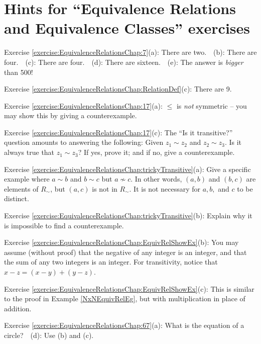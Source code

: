 \section{Hints for ``Equivalence Relations and Equivalence Classes'' exercises}\label{secEqRelChapHints} 

\noindent Exercise \ref{exercise:EquivalenceRelationsChap:7}(a): There are two.~~(b): There are four.~~(c): There are four.~~(d): There are sixteen.~~(e): The answer is \emph{bigger} than 500!

\noindent Exercise \ref{exercise:EquivalenceRelationsChap:RelationDef}(c): There are 9.

\noindent Exercise \ref{exercise:EquivalenceRelationsChap:17}(a): $\leq$ is \emph{not} symmetric -- you may show this by giving a counterexample.

\noindent Exercise \ref{exercise:EquivalenceRelationsChap:17}(c): The ``Is it transitive?'' question amounts to answering the following:  Given $z_1 \sim z_2$ and $z_2 \sim z_3$.  Is it always true that $z_1 \sim z_3$?  If yes, prove it; and if no, give a counterexample. 

\noindent Exercise \ref{exercise:EquivalenceRelationsChap:trickyTransitive}(a): Give a specific example where $a \sim b$ and $b \sim c$ but $a \not\sim c$.  In other words, $(a,b)$ and $(b,c)$ are elements of $R_{\sim}$, but $(a,c)$ is not in  $R_{\sim}$. It is not necessary for $a,b,$ and $c$ to be distinct.

\noindent Exercise \ref{exercise:EquivalenceRelationsChap:trickyTransitive}(b): Explain why it is impossible to find a counterexample.

\noindent Exercise \ref{exercise:EquivalenceRelationsChap:EquivRelShowEx}(b): You may assume (without proof) that the negative of any integer is an integer, and that the sum of any two integers is an integer. For transitivity, notice that $x - z = (x - y) + (y - z)$.

\noindent Exercise \ref{exercise:EquivalenceRelationsChap:EquivRelShowEx}(c): This is similar to the proof in Example \ref{NxNEquivRelEg}, but with multiplication in place of addition.

\noindent Exercise \ref{exercise:EquivalenceRelationsChap:67}(a): What is the equation of a circle?~~(d): Use (b) and (c).
